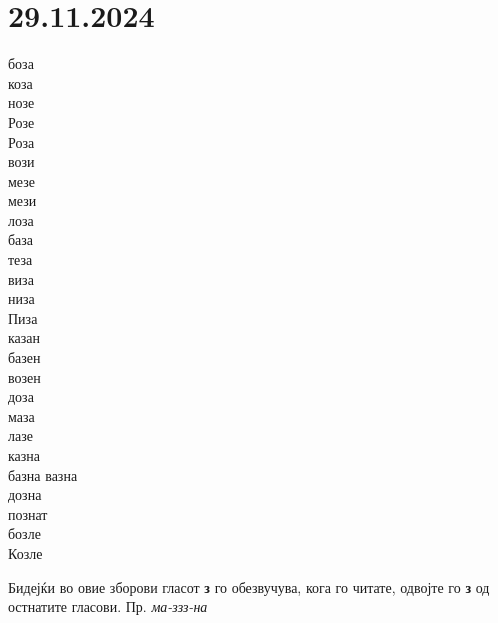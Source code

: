 \documentclass[a5paper,12pt]{article}
\newenvironment{activity}[1]{%
  \begin{tcolorbox}[colback=boxcolor,colframe=titlecolor,title={\textbf{#1}},fonttitle=\bfseries]
}{%
  \end{tcolorbox}
}
\newenvironment{instruction}{%
  \begin{tcolorbox}[colback=white,colframe=accentcolor,title={\textbf{Инструкции}},fonttitle=\bfseries] 
}{%
  \end{tcolorbox}
}
\begin{document}
\section{29.11.2024} 
\begin{activity}{Зборчиња}
\begin{multicols}{4}
боза\\ коза\\ нозе\\ Розе\\ Роза\\ вози\\ мезе\\ мези\\ лоза\\ база\\ теза\\ виза\\ низа\\ Пиза\\ казан\\ базен\\ возен\\ доза\\ маза\\ лазе\\ казна\\ базна
вазна\\ дозна\\ познат\\ бозле\\ Козле
\end{multicols}
\end{activity}

\begin{instruction}
  Бидејќи во овие зборови гласот \textbf{з} го обезвучува, кога го читате, одвојте го \textbf{з} од остнатите гласови. Пр. \emph{ма-ззз-на}
\end{instruction}
\end{document}
